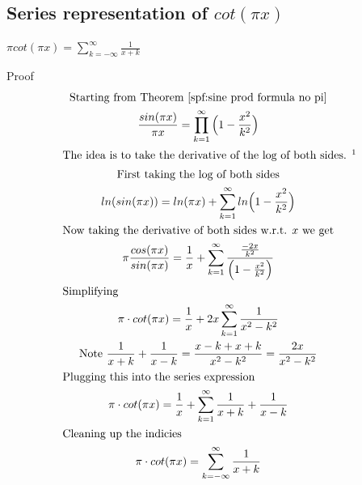 \documentclass[a4paper]{article}
\begin{document}
\subsection{Series representation of $cot(\pi x)$}
\begin{theorem} 
$\boxed{ \pi cot(\pi x) = \sum_{k=-\infty}^{\infty} \frac{1}{x + k} 
}$

Proof\\
\begin{gather*}
\text{Starting from Theorem \ref{spf:sine prod formula no pi}}
\\
\frac{sin(\pi x)}{\pi x} = \prod_{k=1}^{\infty} \Big( 1-\frac{x^2}{k^2} \Big)
\\
\intertext{The idea is to take the derivative of the log of both sides. \footnotemark}
\text{First taking the log of both sides}
\\
ln(sin(\pi x)) = ln(\pi x) + \sum_{k=1}^{\infty} ln \Big( 1-\frac{x^2}{k^2} \Big)
\\
\text{Now taking the derivative of both sides w.r.t. $x$ we get}
\\
\pi \frac{cos(\pi x)}{sin(\pi x)} = \frac{1}{x} + \sum_{k=1}^{\infty} \frac{\frac{-2x}{k^2}}{\Big( 1-\frac{x^2}{k^2} \Big)} 
\\
\intertext{Simplifying} 
\pi \cdot cot(\pi x) = \frac{1}{x} 
+ 2x \sum_{k=1}^{\infty} \frac{1}{x^2-k^2}
\\
\text{Note   } \frac{1}{x+k} + \frac{1}{x-k} = \frac{x-k + x+k}{x^2-k^2} = \frac{2x}{x^2-k^2}
\\
\intertext{Plugging this into the series expression} 
\pi \cdot cot(\pi x) = \frac{1}{x} 
+ \sum_{k=1}^{\infty} \frac{1}{x+k} + \frac{1}{x-k}
\\
\intertext{Cleaning up the indicies}
\pi \cdot cot(\pi x) = \sum_{k=-\infty}^{\infty} \frac{1}{x+k}
\end{gather*}
\end{theorem}

\end{document}
